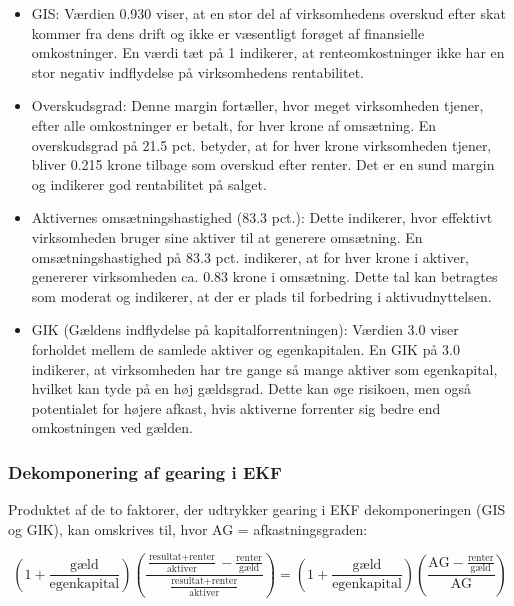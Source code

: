 \documentclass[10pt,reqno, usenames]{article}
\begin{document}
\begin{tcolorbox}[colback=red!5!white, colframe=red!50!black, title= Eksempel af EKF dekomponering, breakable]
\begin{itemize}
    \item GIS: Værdien 0.930 viser, at en stor del af virksomhedens overskud efter skat kommer fra dens drift og ikke er væsentligt forøget af finansielle omkostninger. En værdi tæt på 1 indikerer, at renteomkostninger ikke har en stor negativ indflydelse på virksomhedens rentabilitet.
  \item Overskudsgrad: Denne margin fortæller, hvor meget virksomheden tjener, efter alle omkostninger er betalt, for hver krone af omsætning. En overskudsgrad på 21.5 pct. betyder, at for hver krone virksomheden tjener, bliver 0.215 krone tilbage som overskud efter renter. Det er en sund margin og indikerer god rentabilitet på salget.
\item Aktivernes omsætningshastighed (83.3 pct.): Dette indikerer, hvor effektivt virksomheden bruger sine aktiver til at generere omsætning. En omsætningshastighed på 83.3 pct. indikerer, at for hver krone i aktiver, genererer virksomheden ca. 0.83 krone i omsætning. Dette tal kan betragtes som moderat og indikerer, at der er plads til forbedring i aktivudnyttelsen.
\item GIK (Gældens indflydelse på kapitalforrentningen): Værdien 3.0 viser forholdet mellem de samlede aktiver og egenkapitalen. En GIK på 3.0 indikerer, at virksomheden har tre gange så mange aktiver som egenkapital, hvilket kan tyde på en høj gældsgrad. Dette kan øge risikoen, men også potentialet for højere afkast, hvis aktiverne forrenter sig bedre end omkostningen ved gælden.
\end{itemize}
\end{tcolorbox}

\subsubsection{Dekomponering af gearing i EKF}
Produktet af de to faktorer, der udtrykker gearing i EKF dekomponeringen (GIS og GIK), kan omskrives til, hvor AG = afkastningsgraden:  

\begin{equation}
    \left( 1 + \frac{\text{gæld}}{\text{egenkapital}} \right)
\left( \frac{\frac{\text{resultat}+\text{renter}}{\text{aktiver}} - \frac{\text{renter}}{\text{gæld}}}
             {\frac{\text{resultat}+\text{renter}}{\text{aktiver}}} \right)
= \left( 1 + \frac{\text{gæld}}{\text{egenkapital}} \right)
\left( \frac{\text{AG} - \frac{\text{renter}}{\text{gæld}}}{\text{AG}} \right)
\end{equation}
\end{document}

